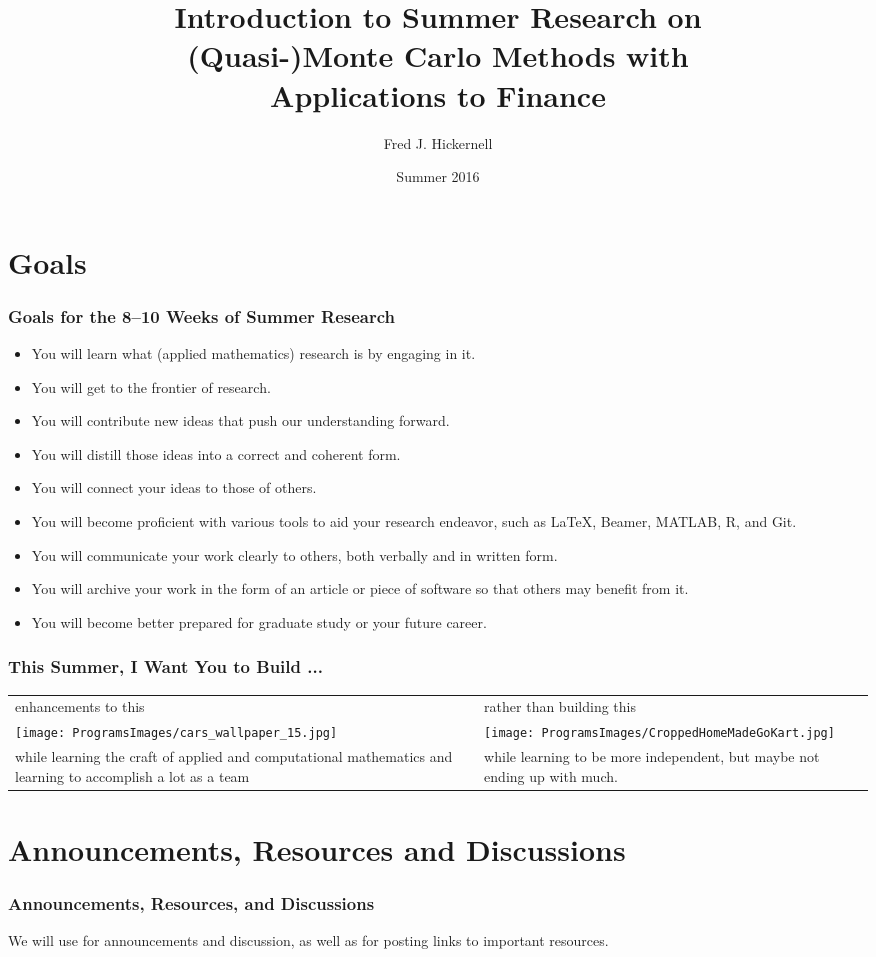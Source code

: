 \documentclass[10pt,compress,xcolor={usenames,dvipsnames},CJK]{beamer}
\title[(Quasi-)Monte Carlo \& Finance]{Introduction to Summer Research on \\
	(Quasi-)Monte Carlo Methods with \\[0.5ex] Applications to Finance}
\author{Fred J. Hickernell}
\institute{Department of Applied Mathematics,  Illinois Institute of Technology \\
\href{mailto:hickernell@iit.edu}{\nolinkurl{hickernell@iit.edu}} \quad
\href{http://mypages.iit.edu/~hickernell}{\nolinkurl{mypages.iit.edu/~hickernell}}}
\date{Summer 2016}
\begin{document}
\frame{\titlepage}

\section{Goals}
\begin{frame}\frametitle{Goals for the 8--10 Weeks of Summer Research}
\begin{itemize}
\item You will learn what (applied mathematics) research is by engaging in it.
\item You will get to the frontier of research.
\item You will contribute new ideas that push our understanding forward.
\item You will distill those ideas into a correct and coherent form.
\item You will connect your ideas to those of others.
\item You will become proficient with various tools to aid your research endeavor, such as \LaTeX, Beamer, MATLAB, R, and Git.
\item You will communicate your work clearly to others, both verbally and in written form.
\item You will archive your work in the form of an article or piece of software so that others may benefit from it.
\item You will become better prepared for graduate study or your future career.
\end{itemize}
\end{frame}

\begin{frame}
\frametitle{This Summer, I Want You to Build ...}
\begin{tabular}{>{\centering}m{5.5cm}>{\centering}m{5.5cm}}
enhancements to this &
rather than building this \tabularnewline
\texttt{[image: ProgramsImages/cars\_wallpaper\_15.jpg]} &
\texttt{[image: ProgramsImages/CroppedHomeMadeGoKart.jpg]} \tabularnewline
while learning the craft of applied and computational mathematics and learning to accomplish a lot as a team & while learning to be more independent, but maybe not ending up with much.
\end{tabular}
\end{frame}




\section{Announcements, Resources and Discussions}
\begin{frame}
\frametitle{Announcements, Resources, and Discussions}

We will use   for announcements and discussion, as well as for posting links to important resources.

\end{frame}
\end{document}
